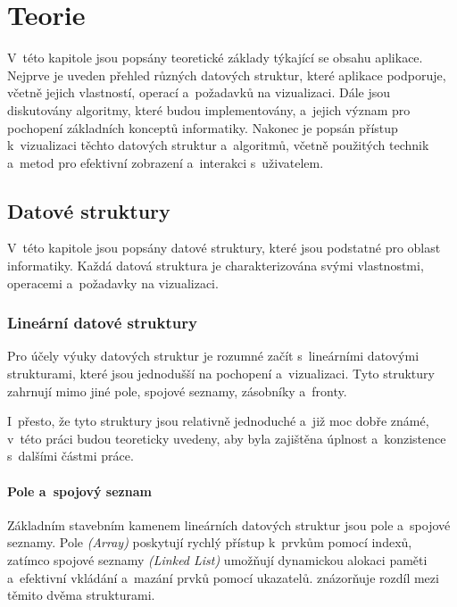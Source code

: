 \chapter{Teorie}
\label{chap:content}

V~této kapitole jsou popsány teoretické základy týkající se obsahu aplikace.
Nejprve je uveden přehled různých datových struktur, které aplikace podporuje, včetně jejich vlastností, operací a~požadavků na vizualizaci.
Dále jsou diskutovány algoritmy, které budou implementovány, a~jejich význam pro pochopení základních konceptů informatiky.
Nakonec je popsán přístup k~vizualizaci těchto datových struktur a~algoritmů, včetně použitých technik a~metod pro efektivní zobrazení a~interakci s~uživatelem.

\section{Datové struktury}
\label{sec:data-structures}

V~této kapitole jsou popsány datové struktury, které jsou podstatné pro oblast informatiky.
Každá datová struktura je charakterizována svými vlastnostmi, operacemi a~požadavky na vizualizaci.

\subsection{Lineární datové struktury}
\label{sec:linear_data_structures}

Pro účely výuky datových struktur je rozumné začít s~lineárními datovými strukturami, které jsou jednodušší na pochopení a~vizualizaci.
Tyto struktury zahrnují mimo jiné pole, spojové seznamy, zásobníky a~fronty.

I~přesto, že tyto struktury jsou relativně jednoduché a~již moc dobře známé, v~této práci budou teoreticky uvedeny, aby byla zajištěna úplnost a~konzistence s~dalšími částmi práce.

\subsubsection*{Pole a~spojový seznam}

Základním stavebním kamenem lineárních datových struktur jsou pole a~spojové seznamy.
Pole \textit{(Array)} poskytují rychlý přístup k~prvkům pomocí indexů, zatímco spojové seznamy \textit{(Linked List)} umožňují dynamickou alokaci paměti a~efektivní vkládání a~mazání prvků pomocí ukazatelů.
 znázorňuje rozdíl mezi těmito dvěma strukturami.~\cite{levitin}

